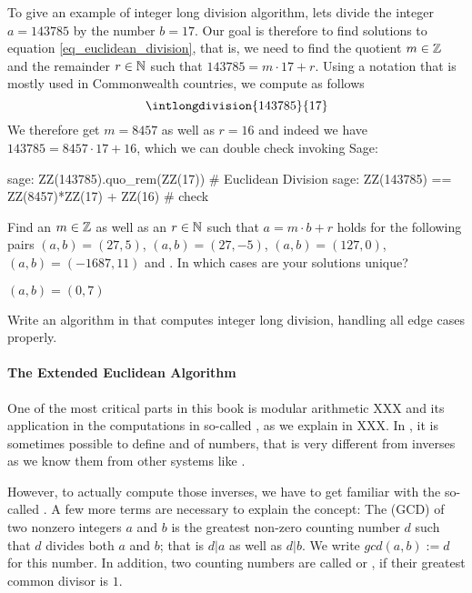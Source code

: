 \begin{example} To give an example of integer long division algorithm, lets divide the integer $a=143785$ by the number $b=17$. Our goal is therefore to find solutions to equation \ref{eq_euclidean_division}, that is, we need to find the quotient $m\in\mathbb{Z}$ and the remainder $r \in \mathbb{N}$ such that $143785 = m\cdot 17 + r$. Using a notation that is mostly used in Commonwealth countries, we compute as follows
\begin{equation}
\intlongdivision{143785}{17}
\end{equation}
We therefore get $m=8457$ as well as $r=16$ and indeed we have $143785 = 8457\cdot 17 + 16$, which we can double check invoking Sage:
\begin{sagecommandline}
sage: ZZ(143785).quo_rem(ZZ(17)) # Euclidean Division
sage: ZZ(143785) == ZZ(8457)*ZZ(17) + ZZ(16) # check
\end{sagecommandline}

\end{example}
\begin{exercise}
Find an $m\in\mathbb{Z}$ as well as an $r\in\mathbb{N}$ such that $a= m\cdot b +r$ holds for the following pairs $(a,b) = (27,5)$, $(a,b)=(27,-5)$, $(a,b)=(127,0)$, $(a,b)= (-1687, 11)$ and . In which cases are your solutions unique?
\end{exercise}$(a,b)= (0, 7)$
\begin{exercise}
Write an algorithm in  that computes integer long division, handling all edge cases properly.
\end{exercise}

\paragraph{The Extended Euclidean Algorithm}
One of the most critical parts in this book is modular arithmetic XXX and its application in the computations in so-called , as we explain in XXX. In , it is sometimes possible to define  and  of numbers, that is very different from inverses as we know them from other systems like . 

However, to actually compute those inverses, we have to get familiar with the so-called . A few more terms are necessary to explain the concept: The  (GCD) of two nonzero integers $a$ and $b$ is the greatest non-zero counting number $d$ such that $d$ divides both $a$ and $b$; that is $d|a$ as well as $d|b$. We write $ gcd (a, b):=d $ for this number. In addition, two counting numbers are called  or , if their greatest common divisor is $1$.


